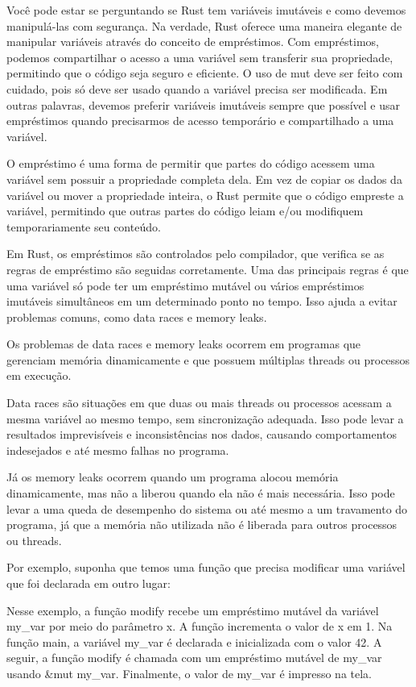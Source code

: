 \documentclass[12pt,a4paper,oneside]{abntex2}
\begin{document}
Você pode estar se perguntando se Rust tem variáveis imutáveis e como devemos manipulá-las com segurança. Na verdade, Rust oferece uma maneira elegante de manipular variáveis através do conceito de empréstimos. Com empréstimos, podemos compartilhar o acesso a uma variável sem transferir sua propriedade, permitindo que o código seja seguro e eficiente. O uso de mut deve ser feito com cuidado, pois só deve ser usado quando a variável precisa ser modificada. Em outras palavras, devemos preferir variáveis imutáveis sempre que possível e usar empréstimos quando precisarmos de acesso temporário e compartilhado a uma variável.

O empréstimo é uma forma de permitir que partes do código acessem uma variável sem possuir a propriedade completa dela. Em vez de copiar os dados da variável ou mover a propriedade inteira, o Rust permite que o código empreste a variável, permitindo que outras partes do código leiam e/ou modifiquem temporariamente seu conteúdo.

Em Rust, os empréstimos são controlados pelo compilador, que verifica se as regras de empréstimo são seguidas corretamente. Uma das principais regras é que uma variável só pode ter um empréstimo mutável ou vários empréstimos imutáveis simultâneos em um determinado ponto no tempo. Isso ajuda a evitar problemas comuns, como data races e memory leaks.

Os problemas de data races e memory leaks ocorrem em programas que gerenciam memória dinamicamente e que possuem múltiplas threads ou processos em execução.

Data races são situações em que duas ou mais threads ou processos acessam a mesma variável ao mesmo tempo, sem sincronização adequada. Isso pode levar a resultados imprevisíveis e inconsistências nos dados, causando comportamentos indesejados e até mesmo falhas no programa.

Já os memory leaks ocorrem quando um programa alocou memória dinamicamente, mas não a liberou quando ela não é mais necessária. Isso pode levar a uma queda de desempenho do sistema ou até mesmo a um travamento do programa, já que a memória não utilizada não é liberada para outros processos ou threads.


Por exemplo, suponha que temos uma função que precisa modificar uma variável que foi declarada em outro lugar:
%

Nesse exemplo, a função modify recebe um empréstimo mutável da variável my\_var por meio do parâmetro x. A função incrementa o valor de x em 1. Na função main, a variável my\_var é declarada e inicializada com o valor 42. A seguir, a função modify é chamada com um empréstimo mutável de my\_var usando \&mut my\_var. Finalmente, o valor de my\_var é impresso na tela.
\end{document}
